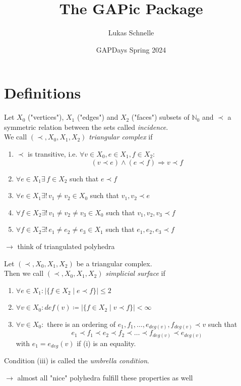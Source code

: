 \documentclass{beamer}
\title{The GAPic Package}
\subtitle{}
\author{Lukas Schnelle}
\date{GAPDays Spring 2024}
\numberwithin{equation}{aufgabe}
\newcommand\N{\mathbb N}
\begin{document}
\frame[plain]{\titlepage}

\section{Definitions}
\begin{frame}
    \begin{definition}\label{def:triangular-comp}
    	Let $X_0$ ("vertices"), $X_1$ ("edges") and $X_2$ ("faces") subsets of $\N_0$ and $\prec$ a symmetric relation between the sets called \emph{incidence}. \pause \\
    	We call $(\prec, X_0, X_1, X_2)$ \emph{triangular complex} if
    	\begin{enumerate}[label=(\roman*)] \pause 
    		\item $\prec$ is transitive, i.e. $\forall v \in X_0, e \in X_1, f \in X_2$:
    		$$(v \prec e) \wedge (e \prec f) \Rightarrow v \prec f$$ \vspace{-15px} \pause
    		\item $\forall e \in X_1 \exists \, f \in X_2$ such that $e \prec f$ \pause 
    		\item $\forall e \in X_1 \exists !\,  v_1 \neq v_2 \in X_0$ such that $v_1, v_2 \prec e$ \pause 
    		\item $\forall f \in X_2 \exists ! \, v_1 \neq v_2 \neq v_3 \in X_0$ such that $v_1, v_2, v_3 \prec f$ \pause 
            \item $\forall f \in X_2 \exists ! \, e_1 \neq e_2 \neq e_3 \in X_1$ such that $e_1, e_2, e_3 \prec f$ \pause 
    	\end{enumerate}
    \end{definition} \pause
    $\xrightarrow{}$ think of triangulated polyhedra
\end{frame}

\begin{frame}
    \begin{definition}
        Let $(\prec, X_0, X_1, X_2)$ be a triangular complex.\\
        Then we call $(\prec, X_0, X_1, X_2)$ \emph{simplicial surface} if \pause
        \begin{enumerate}[label=(\roman*)]
            \item $\forall e \in X_1 : | \{ f \in X_2 \mid e \prec f \} | \leq 2 $ 
            \item $\forall v \in X_0 : def(v) \coloneqq | \{ f \in X_2 \mid v \prec f \} | < \infty$ 
            \item $\forall v \in X_0: $ there is an ordering of $e_1, f_1, \dots, e_{deg(v)}, f_{deg(v)} \prec v$ such that 
            $$
                e_1 \prec f_1 \prec e_2 \prec f_2 \prec \dots \prec f_{deg(v)} \prec e_{deg(v)}
            $$
            with $e_1 = e_{deg}(v)$ if (i) is an equality.\pause
        \end{enumerate} 
        Condition (iii) is called the \emph{umbrella condition}.
    \end{definition}
    \pause
    $\xrightarrow{}$ almost all "nice" polyhedra fulfill these properties as well 
\end{frame}
\end{document}
